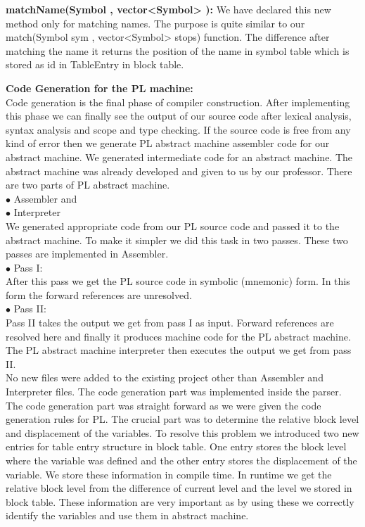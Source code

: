 \documentclass[paper=letter, fontsize=12pt]{scrartcl} %
\begin{document}
{\bf matchName(Symbol , vector<Symbol> ):}
We have declared this new method only for matching names. The purpose is quite similar to our match(Symbol sym , vector<Symbol> stops) function. The difference after matching the name it returns the position of the name in symbol table which is stored as id in TableEntry in block table.\\           

\pagebreak

{\bf {\huge Code Generation for the PL machine:}}\\

Code generation is the final phase of compiler construction. After implementing this phase we can finally see the output of our source code after lexical analysis, syntax analysis and scope and type checking. If the source code is free from any kind of error then we generate PL abstract machine assembler code for our abstract machine. We generated intermediate code for an abstract machine. The abstract machine was already developed and given to us by our professor.  There are two parts of PL abstract machine.\\
$\bullet$ Assembler and \\
$\bullet$ Interpreter\\

We generated appropriate code from our PL source code and passed it to the abstract machine.
To make it simpler we did this task in two passes. These two passes are implemented in Assembler.\\
\newline
$\bullet$ Pass I:\\
After this pass we get the PL source code in symbolic (mnemonic) form. In this form the forward references are unresolved. \\
$\bullet$ Pass II:\\
Pass II takes the output we get from pass I as input. Forward references are resolved here and finally it produces machine code for the PL abstract machine.   \\

The PL abstract machine interpreter then executes the output we get from pass II. \\

No new files were added to the existing project other than Assembler and Interpreter files. The code generation part was implemented inside the parser. The code generation part was straight forward as we were given the code generation rules for PL. The crucial part was to determine the relative block level and displacement of the variables. To resolve this problem we introduced two new entries for table entry structure in block table. One entry stores the block level where the variable was defined and the other entry stores the displacement of the variable. We store these information in compile time. In runtime we get the relative block level from the difference of current level and the level we stored in block table. These information are very important as by using these we correctly identify the variables and use them in abstract machine. \\  
\end{document}

